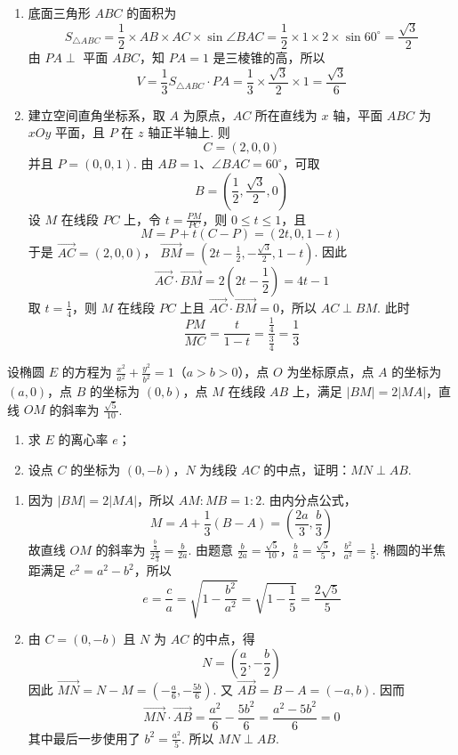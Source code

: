 \begin{solution}
\begin{enumerate}
\item 底面三角形 \(ABC\) 的面积为
\[
S_{\triangle ABC}=\frac12\times AB\times AC\times\sin\angle BAC
=\frac12\times1\times2\times\sin60^\circ=\frac{\sqrt3}{2}
\]
由 \(PA\perp\) 平面 \(ABC\)，知 \(PA=1\) 是三棱锥的高，所以
\[
V=\frac13S_{\triangle ABC}\cdot PA=\frac13\times\frac{\sqrt3}{2}\times1=\frac{\sqrt3}{6}
\]
\item 建立空间直角坐标系，取 \(A\) 为原点，\(AC\) 所在直线为 \(x\) 轴，平面 \(ABC\) 为 \(xOy\) 平面，且 \(P\) 在 \(z\) 轴正半轴上. 则
\[
C=(2,0,0)
\]
并且 \(P=(0,0,1)\).
由 \(AB=1\)、\(\angle BAC=60^\circ\)，可取
\[
B=\left(\frac12,\frac{\sqrt3}{2},0\right)
\]
设 \(M\) 在线段 \(PC\) 上，令 \(t=\frac{PM}{PC}\)，则 \(0\leq t\leq1\)，且
\[
M=P+t(C-P)=(2t,0,1-t)
\]
于是 \(\overrightarrow{AC}=(2,0,0)\)，
\(\overrightarrow{BM}=\left(2t-\frac12,-\frac{\sqrt3}{2},1-t\right)\).
因此
\[
\overrightarrow{AC}\cdot\overrightarrow{BM}=2\left(2t-\frac12\right)=4t-1
\]
取 \(t=\frac14\)，则 \(M\) 在线段 \(PC\) 上且 \(\overrightarrow{AC}\cdot\overrightarrow{BM}=0\)，所以 \(AC\perp BM\). 此时
\[
\frac{PM}{MC}=\frac{t}{1-t}=\frac{\frac{1}{4}}{\frac{3}{4}}=\frac13
\]
\end{enumerate}
\end{solution}

\begin{problem}
设椭圆 \(E\) 的方程为 \(\frac{x^2}{a^2} + \frac{y^2}{b^2} = 1\)（\(a > b > 0\)），点 \(O\) 为坐标原点，点 \(A\) 的坐标为 \((a, 0)\)，点 \(B\) 的坐标为 \((0, b)\)，点 \(M\) 在线段 \(AB\) 上，满足 \(|BM| = 2|MA|\)，直线 \(OM\) 的斜率为 \(\frac{\sqrt{5}}{10}\).
\begin{enumerate}
\item 求 \(E\) 的离心率 \(e\)；
\item 设点 \(C\) 的坐标为 \((0, -b)\)，\(N\) 为线段 \(AC\) 的中点，证明：\(MN \perp AB\).
\end{enumerate}
\end{problem}

\begin{solution}
\begin{enumerate}
\item 因为 \(|BM|=2|MA|\)，所以 \(AM:MB=1:2\). 由内分点公式，
\[
M=A+\frac13(B-A)=\left(\frac{2a}{3},\frac{b}{3}\right)
\]
故直线 \(OM\) 的斜率为 \(\frac{\frac{b}{3}}{2\frac{a}{3}}=\frac{b}{2a}\). 由题意
\(\frac{b}{2a}=\frac{\sqrt5}{10}\)，\(\frac ba=\frac{\sqrt5}{5}\)，\(\frac{b^2}{a^2}=\frac15\).
椭圆的半焦距满足 \(c^2=a^2-b^2\)，所以
\[
e=\frac ca=\sqrt{1-\frac{b^2}{a^2}}=\sqrt{1-\frac15}=\frac{2\sqrt5}{5}
\]
\item 由 \(C=(0,-b)\) 且 \(N\) 为 \(AC\) 的中点，得
\[
N=\left(\frac a2,-\frac b2\right)
\]
因此 \(\overrightarrow{MN}=N-M=\left(-\frac a6,-\frac{5b}{6}\right)\).
又 \(\overrightarrow{AB}=B-A=(-a,b)\). 因而
\[
\overrightarrow{MN}\cdot\overrightarrow{AB}
=\frac{a^2}{6}-\frac{5b^2}{6}
=\frac{a^2-5b^2}{6}=0
\]
其中最后一步使用了 \(b^2=\frac{a^2}{5}\). 所以 \(MN\perp AB\).
\end{enumerate}
\end{solution}

